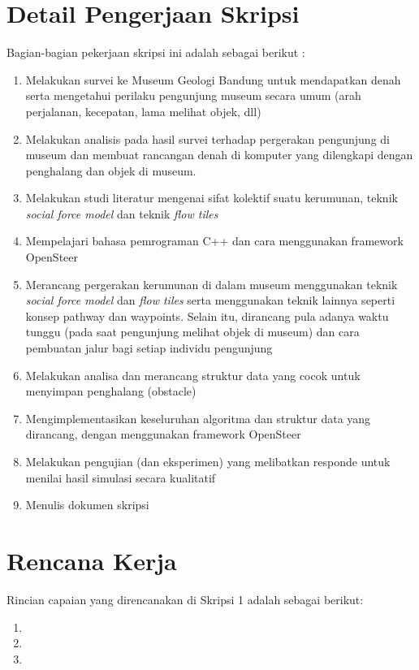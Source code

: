 \documentclass[a4paper,twoside]{article}
\begin{document}
\section{Detail Pengerjaan Skripsi}

Bagian-bagian pekerjaan skripsi ini adalah sebagai berikut :
	\begin{enumerate}
		\item Melakukan survei ke Museum Geologi Bandung untuk mendapatkan denah serta mengetahui perilaku pengunjung museum secara umum (arah perjalanan, kecepatan, lama melihat objek, dll)
		\item Melakukan analisis pada hasil survei terhadap pergerakan pengunjung di museum dan membuat rancangan denah di komputer yang dilengkapi dengan penghalang dan objek di museum.
		\item Melakukan studi literatur mengenai sifat kolektif suatu kerumunan, teknik {\it social force model} dan teknik {\it flow tiles}
		\item Mempelajari bahasa pemrograman C++ dan cara menggunakan framework OpenSteer
		\item Merancang pergerakan kerumunan di dalam museum menggunakan teknik {\it social force model} dan {\it flow tiles} serta menggunakan teknik lainnya seperti konsep pathway dan waypoints. Selain itu, dirancang pula adanya waktu tunggu (pada saat pengunjung melihat objek di museum) dan cara pembuatan jalur bagi setiap individu pengunjung
		\item Melakukan analisa dan merancang struktur data yang cocok untuk menyimpan penghalang (obstacle)
		\item Mengimplementasikan keseluruhan algoritma dan struktur data yang dirancang, dengan menggunakan framework OpenSteer 
		\item Melakukan pengujian (dan eksperimen) yang melibatkan responde untuk menilai hasil simulasi secara kualitatif
		\item Menulis dokumen skripsi
	\end{enumerate}

\section{Rencana Kerja}
Rincian capaian yang direncanakan di Skripsi 1 adalah sebagai berikut:
\begin{enumerate}
\item
\item
\item
\end{enumerate}
\end{document}
